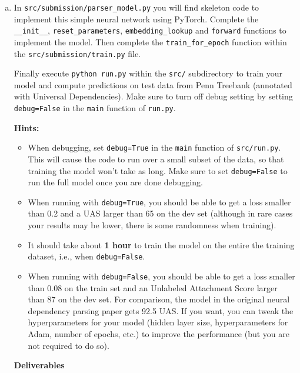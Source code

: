 \begin{enumerate}[(a)]
    \item {} In \texttt{src/submission/parser\_model.py} you will find skeleton code to implement this simple neural network using PyTorch. Complete the \texttt{\_\_init\_\_}, \texttt{reset\_parameters}, \texttt{embedding\_lookup} and \texttt{forward} functions to implement the model. Then complete the \texttt{train\_for\_epoch} function within the \texttt{src/submission/train.py} file. \newline
   
    Finally execute \texttt{python run.py} within the \texttt{src/} subdirectory to train your model and compute predictions
    on test data from Penn Treebank (annotated with Universal Dependencies). Make sure to turn off debug setting by setting \texttt{debug=False} in the \texttt{main} function of \texttt{run.py}.
    
    \textbf{Hints:}
    \begin{itemize}
        \item
            When debugging, set \texttt{debug=True} in the \texttt{main} function of \texttt{src/run.py}. This will cause the code to run over a small subset of the data, so that training the model won't take as long. Make sure to set \texttt{debug=False} to run the full model once you are done debugging.

        \item
            When running with \texttt{debug=True}, you should be able to get a loss smaller than 0.2 and a UAS larger than 65 on the dev set (although in rare cases your results may be lower, there is some randomness when training).
            
        \item It should take about \textbf{1 hour} to train the model on the entire the training dataset, i.e., when \texttt{debug=False}.
        
        \item When running with \texttt{debug=False}, you should be able to get a loss smaller than 0.08 on the train set and an Unlabeled Attachment Score larger than 87 on the dev set. For comparison, the model in the original neural dependency parsing paper gets 92.5 UAS. If you want, you can tweak the hyperparameters for your model (hidden layer size, hyperparameters for Adam, number of epochs, etc.) to improve the performance (but you are not required to do so).
    \end{itemize}
    \clearpage

    \textbf{Deliverables}


\end{enumerate}
